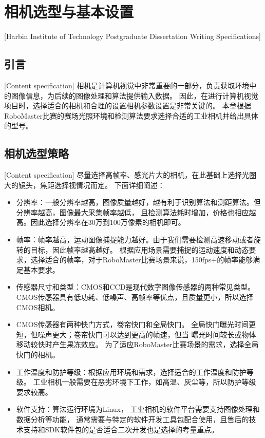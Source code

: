 

\chapter[相机选型与基本设置]{相机选型与基本设置}[Harbin Institute of Technology Postgraduate Dissertation Writing Specifications]

\section{引言}[Content specification]
相机是计算机视觉中非常重要的一部分，负责获取环境中的图像信息，为后续的图像处理和算法提供输入数据。
因此，在进行计算机视觉项目时，选择适合的相机和合理的设置相机参数设置是非常关键的。
本章根据RoboMaster比赛的赛场光照环境和检测算法要求选择合适的工业相机并给出具体的型号。

\section{相机选型策略}[Content specification]
尽量选择高帧率、感光片大的相机，在此基础上选择光圈大的镜头，焦距选择视情况而定。
下面详细阐述：\par

\begin{itemize}[itemindent=2em]
    \item 分辨率：一般分辨率越高，图像质量越好，越有利于识别算法和测距算法。但分辨率越高，图像最大采集帧率越低，
    且检测算法耗时增加，价格也相应越高。因此选择分辨率在30万到100万像素的相机即可。
    \item 帧率：帧率越高，运动图像捕捉能力越好。由于我们需要检测高速移动或者旋转的目标，因此帧率越高越好。
    根据应用场景需要捕捉的运动速度和动态要求，选择适合的帧率，对于RoboMaster比赛场景来说，150fps+的帧率能够满足基本要求。
    \item 传感器尺寸和类型：CMOS和CCD是现代数字图像传感器的两种常见类型。
    CMOS传感器具有低功耗、低噪声、高帧率等优点，且质量更小，所以选择CMOS相机。
    \item CMOS传感器有两种快门方式，卷帘快门和全局快门。
    全局快门曝光时间更短，但噪声更大；卷帘快门可以达到更高的帧速，但当
    曝光时间较长或物体移动较快时产生果冻效应。
    为了适应RoboMaster比赛场景的需求，选择全局快门的相机。
    \item 工作温度和防护等级：根据应用环境和需求，选择适合的工作温度和防护等级。
    工业相机一般需要在恶劣环境下工作，如高温、灰尘等，所以防护等级要求较高。
    \item 软件支持：算法运行环境为Linux，
    工业相机的软件平台需要支持图像处理和数据分析等功能，
    通常需要与特定的软件开发工具包配合使用，且售后的技术支持和SDK软件包的是否适合二次开发也是选择的考量重点。

\end{itemize}


